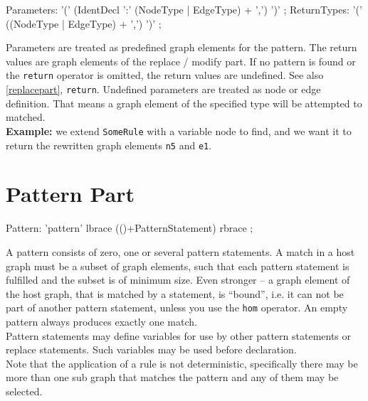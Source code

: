 \begin{rail}
  Parameters: '(' (IdentDecl ':' (NodeType | EdgeType) + ',') ')' ;
  ReturnTypes: '(' ((NodeType | EdgeType) + ',') ')' ;
\end{rail}
Parameters are treated as predefined graph elements for the pattern. The return values are graph elements of the replace / modify part. If no pattern is found or the \texttt{return} operator is omitted, the return values are undefined. See also \ref{replacepart}, \texttt{return}. Undefined parameters are treated as node or edge definition. That means a graph element of the specified type will be attempted to matched.\\
{\small \textbf{Example:} we extend \texttt{SomeRule} with a variable node to find, and we want it to return the rewritten graph elements \texttt{n5} and \texttt{e1}.}
\begin{grgen}
  rule SomeRuleExt(varnode: Node): (Node, EdgeTypeB) {
    pattern{
      varnode;
      n1: NodeTypeA;
      ...
    }
    replace {
      varnode;
      ...  
      return(n5, e1);
      eval {
        ...
\end{grgen}

\section{Pattern Part}
\label{patternpart}
\begin{rail}
  Pattern: 'pattern' lbrace (()+PatternStatement) rbrace ;
\end{rail}
A pattern consists of zero, one or several pattern statements. A match in a host graph must be a subset of graph elements, such that each pattern statement is fulfilled and the subset is of minimum size. Even stronger -- a graph element of the host graph, that is matched by a statement, is ``bound'', i.e. it can not be part of another pattern statement, unless you use the \texttt{hom} operator. An empty pattern always produces exactly one match.\\
Pattern statements may define variables for use by other pattern statements or replace statements. Such variables may be used before declaration.\\
Note that the application of a rule is not deterministic, specifically there may be more than one sub graph that matches the pattern and any of them may be selected.

